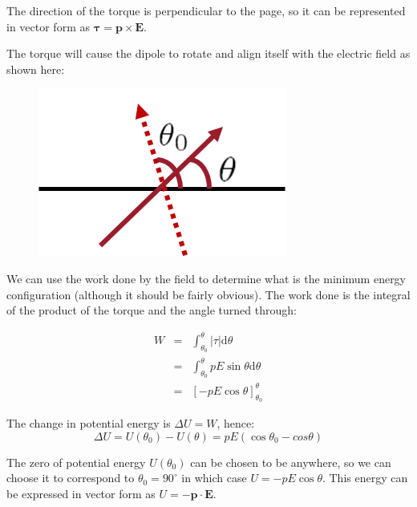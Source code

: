 \documentclass[
]{book}
\numberwithin{equation}{section}
\begin{document}
The direction of the torque is perpendicular to the page, so it can be
represented in vector form as \(\boldsymbol{\tau} = \mathbf{p} \times \mathbf{E}\).

The torque will cause the dipole to rotate and align itself with the
electric field as shown here:

\begin{figure}

{\centering \includegraphics[width=0.7\linewidth]{Figures/dipole_align} 

}

\caption{ }\label{fig:dipoleAlign}
\end{figure}

We can use the work done by the field to determine what is the minimum
energy configuration (although it should be fairly obvious). The work
done is the integral of the product of the torque and the angle turned
through:

\begin{equation}
\label{eq:workDone}
\begin{array}{rcll}
W &=& \int_{\theta_0}^{\theta} |\tau| \mathrm{d}\theta \\
&=& \int_{\theta_0}^{\theta} pE \sin\theta \mathrm{d}\theta \\ 
&=& [-pE \cos\theta]_{\theta_0}^{\theta}
\end{array}
\end{equation}

The change in potential energy is \(\Delta U = W\), hence:
\begin{equation}
\label{eq:changeEpot}
\Delta U = U(\theta_0) - U(\theta) = pE(\cos⁡\theta_0 - cos\theta)
\end{equation}

The zero of potential energy \(U(\theta_0)\) can be chosen to be anywhere,
so we can choose it to correspond to \(\theta_0 = 90^{\circ}\) in which
case \(U = -pE \cos\theta\). This energy can be expressed in vector form
as \(U = - \mathbf{p} \cdot \mathbf{E}\).
\end{document}
